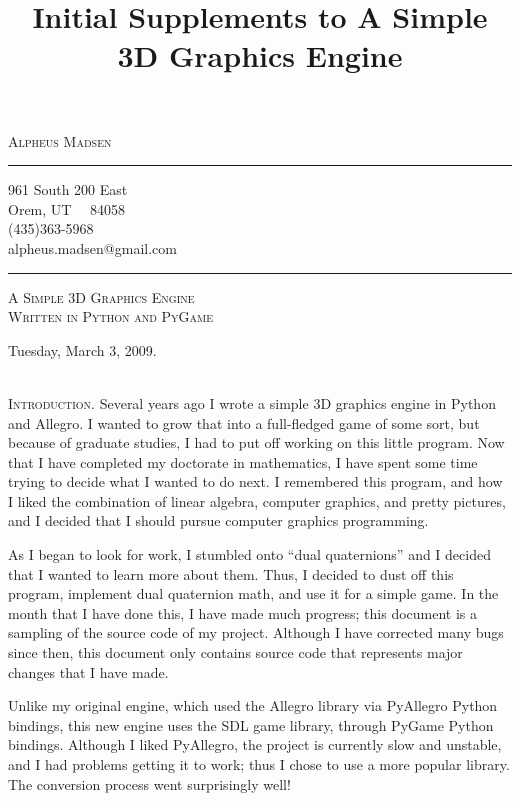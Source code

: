 \documentclass[10pt]{article}
\title{Initial Supplements to A Simple 3D Graphics Engine}
\author{\headerstuff}
\date{}
\makeatletter
\newcommand{\titleize}[1]{
   \begin{center}
       \Large \textsc{#1} \normalsize \\
   \end{center}
}
\newcommand{\normaltitleize}[1]{\mbox{}\\ \textsc{#1} \normalsize}
\newcommand{\headerstuff}{
   \begin{center}
   \textsc{\Large{Alpheus Madsen}}

   \rule{1in}{.01in}

   961 South 200 East\\

   Orem, UT \ \ 84058  \\

   (435)363-5968 \\

   alpheus.madsen@gmail.com

   \rule{2in}{.01in}
   \end{center}
}
\makeatother
\begin{document}

\headerstuff

\titleize{A Simple 3D Graphics Engine\\Written in Python and PyGame}

\begin{center}
   Tuesday, March 3, 2009.
\end{center}

\normaltitleize{Introduction.}  Several years ago I wrote a simple 3D graphics engine in Python and Allegro.  I wanted to grow that into a full-fledged game of some sort, but because of graduate studies, I had to put off working on this little program.  Now that I have completed my doctorate in mathematics, I have spent some time trying to decide what I wanted to do next.  I remembered this program, and how I liked the combination of linear algebra, computer graphics, and pretty pictures, and I decided that I should pursue computer graphics programming.

As I began to look for work, I stumbled onto ``dual quaternions'' and I decided that I wanted to learn more about them.  Thus, I decided to dust off this program, implement dual quaternion math, and use it for a simple game.  In the month that I have done this, I have made much progress; this document is a sampling of the source code of my project.  Although I have corrected many bugs since then, this document only contains source code that represents major changes that I have made.

Unlike my original engine, which used the Allegro library via PyAllegro Python bindings, this new engine uses the SDL game library, through PyGame Python bindings.  Although I liked PyAllegro, the project is currently slow and unstable, and I had problems getting it to work; thus I chose to use a more popular library.  The conversion process went surprisingly well!
\end{document}
